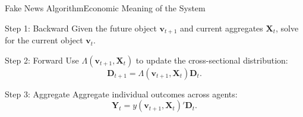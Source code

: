 \documentclass[aspectratio=169]{beamer}
\begin{document}
\begin{frame}{Fake News Algorithm}{Economic Meaning of the System}
    \small
    \begin{block}{Step 1: Backward}
        Given the future object $\bm{v}_{t+1}$ and current aggregates $\bm{X}_t$,
        solve for the current object $\bm{v}_t$.
    \end{block}

    \begin{block}{Step 2: Forward}
        Use $\Lambda(\bm{v}_{t+1}, \bm{X}_t)$ to update the cross-sectional distribution:
        \[
            \bm{D}_{t+1} = \Lambda(\bm{v}_{t+1}, \bm{X}_t)\bm{D}_t.
        \]
    \end{block}

    \begin{block}{Step 3: Aggregate}
        Aggregate individual outcomes across agents:
        \[
            \bm{Y}_t = y(\bm{v}_{t+1}, \bm{X}_t)' \bm{D}_t.
        \]
    \end{block}


\end{frame}
\end{document}
